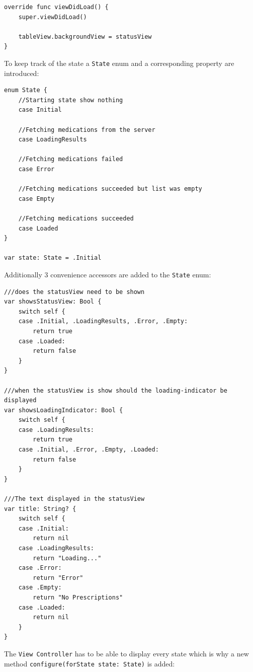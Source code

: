 \documentclass{article}
\begin{document}
\begin{verbatim}
override func viewDidLoad() {
    super.viewDidLoad()

    tableView.backgroundView = statusView
}
\end{verbatim}
To keep track of the state a \texttt{State} enum and a corresponding
property are introduced:

\begin{verbatim}
enum State {
    //Starting state show nothing
    case Initial

    //Fetching medications from the server
    case LoadingResults

    //Fetching medications failed
    case Error

    //Fetching medications succeeded but list was empty
    case Empty

    //Fetching medications succeeded
    case Loaded
}

var state: State = .Initial
\end{verbatim}
Additionally 3 convenience accessors are added to the \texttt{State}
enum:

\begin{verbatim}
///does the statusView need to be shown
var showsStatusView: Bool {
    switch self {
    case .Initial, .LoadingResults, .Error, .Empty:
        return true
    case .Loaded:
        return false
    }
}

///when the statusView is show should the loading-indicator be displayed
var showsLoadingIndicator: Bool {
    switch self {
    case .LoadingResults:
        return true
    case .Initial, .Error, .Empty, .Loaded:
        return false
    }
}

///The text displayed in the statusView
var title: String? {
    switch self {
    case .Initial:
        return nil
    case .LoadingResults:
        return "Loading..."
    case .Error:
        return "Error"
    case .Empty:
        return "No Prescriptions"
    case .Loaded:
        return nil
    }
}
\end{verbatim}
The \texttt{View\ Controller} has to be able to display every state
which is why a new method \texttt{configure(forState\ state:\ State)} is
added:
\end{document}
